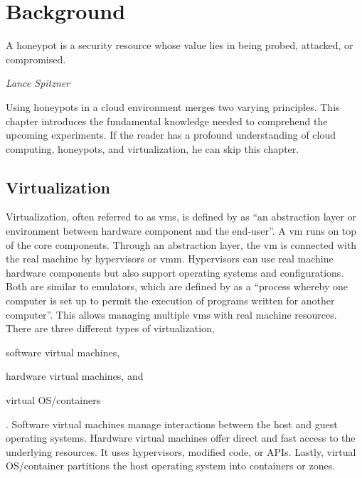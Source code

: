 \chapter{Background}
\label{chap:background}

\epigraph{A honeypot is a security resource whose value lies in being probed, attacked, or compromised.}{\textit{Lance Spitzner}}

Using honeypots in a cloud environment merges two varying principles.
This chapter introduces the fundamental knowledge needed to comprehend the upcoming experiments.
If the reader has a profound understanding of cloud computing, honeypots, and virtualization, he can skip this chapter.

\section{Virtualization}

Virtualization, often referred to as \acp{vm}, is defined by \citet{kreuter2004} as \enquote{an abstraction layer or environment between hardware component and the end-user}.
A \ac{vm} runs on top of the  core components.
Through an abstraction layer, the \acl{vm} is connected with the real machine by hypervisors or \ac{vmm}.
Hypervisors can use real machine hardware components but also support  operating systems and configurations.
Both are similar to emulators, which are defined by \citet{lichstei1969} as a \enquote{process whereby one computer is set up to permit the execution of programs written for another computer}.
This allows managing multiple \acp{vm} with real machine resources.
There are three different types of virtualization,
\begin{enumerate*}[label=(\roman*)]
    \item software virtual machines,
    \item hardware virtual machines, and
    \item virtual OS/containers
\end{enumerate*}.
Software virtual machines manage interactions between the host and guest operating systems.
Hardware virtual machines offer direct and fast access to the underlying resources.
It uses hypervisors, modified code, or APIs.
Lastly, virtual OS/container partitions the host operating system into containers or zones.
\cite{daniels2009}

